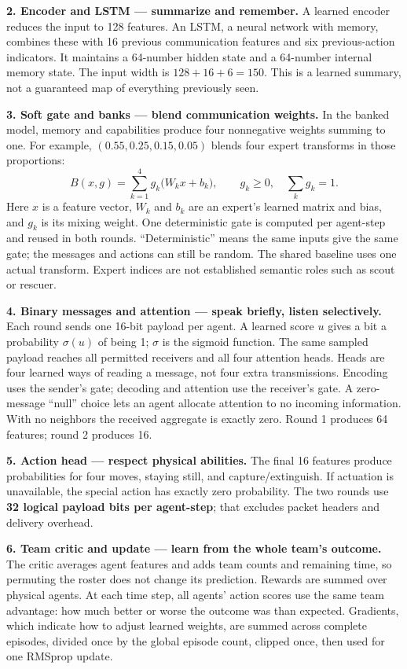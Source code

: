 \documentclass[11pt,letterpaper]{article}
\begin{document}
\textbf{2. Encoder and LSTM --- summarize and remember.} A learned encoder reduces the input to 128 features. An LSTM, a neural network with memory, combines these with 16 previous communication features and six previous-action indicators. It maintains a 64-number hidden state and a 64-number internal memory state. The input width is $128+16+6=150$. This is a learned summary, not a guaranteed map of everything previously seen.

\textbf{3. Soft gate and banks --- blend communication weights.} In the banked model, memory and capabilities produce four nonnegative weights summing to one. For example, $(0.55,0.25,0.15,0.05)$ blends four expert transforms in those proportions:
\[
 B(x,g)=\sum_{k=1}^{4}g_k\bigl(W_kx+b_k\bigr),\qquad g_k\geq0,\quad \sum_k g_k=1.
\]
Here $x$ is a feature vector, $W_k$ and $b_k$ are an expert's learned matrix and bias, and $g_k$ is its mixing weight. One deterministic gate is computed per agent-step and reused in both rounds. ``Deterministic'' means the same inputs give the same gate; the messages and actions can still be random. The shared baseline uses one actual transform. Expert indices are not established semantic roles such as scout or rescuer.

\textbf{4. Binary messages and attention --- speak briefly, listen selectively.} Each round sends one 16-bit payload per agent. A learned score $u$ gives a bit a probability $\sigma(u)$ of being 1; $\sigma$ is the sigmoid function. The same sampled payload reaches all permitted receivers and all four attention heads. Heads are four learned ways of reading a message, not four extra transmissions. Encoding uses the sender's gate; decoding and attention use the receiver's gate. A zero-message ``null'' choice lets an agent allocate attention to no incoming information. With no neighbors the received aggregate is exactly zero. Round 1 produces 64 features; round 2 produces 16.

\textbf{5. Action head --- respect physical abilities.} The final 16 features produce probabilities for four moves, staying still, and capture/extinguish. If actuation is unavailable, the special action has exactly zero probability. The two rounds use \textbf{32 logical payload bits per agent-step}; that excludes packet headers and delivery overhead.

\textbf{6. Team critic and update --- learn from the whole team's outcome.} The critic averages agent features and adds team counts and remaining time, so permuting the roster does not change its prediction. Rewards are summed over physical agents. At each time step, all agents' action scores use the same team advantage: how much better or worse the outcome was than expected. Gradients, which indicate how to adjust learned weights, are summed across complete episodes, divided once by the global episode count, clipped once, then used for one RMSprop update.
\end{document}
